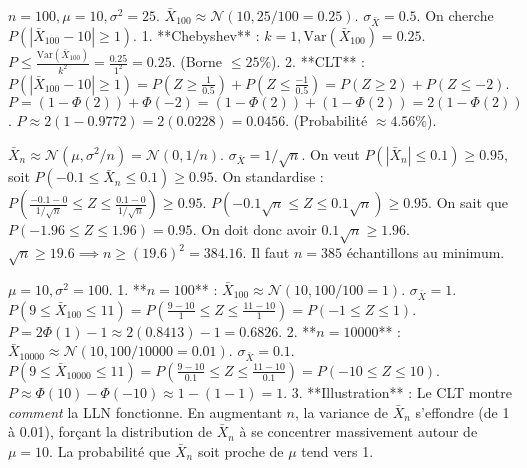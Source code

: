 \begin{correctionbox}
$n=100, \mu=10, \sigma^2=25$. $\bar{X}_{100} \approx \mathcal{N}(10, 25/100=0.25)$. $\sigma_{\bar{X}} = 0.5$.
On cherche $P(|\bar{X}_{100} - 10| \ge 1)$.
1.  **Chebyshev** : $k=1, \text{Var}(\bar{X}_{100}) = 0.25$.
    $P \le \frac{\text{Var}(\bar{X}_{100})}{k^2} = \frac{0.25}{1^2} = 0.25$. (Borne $\le 25\%$).
2.  **CLT** : $P(|\bar{X}_{100} - 10| \ge 1) = P(Z \ge \frac{1}{0.5}) + P(Z \le \frac{-1}{0.5}) = P(Z \ge 2) + P(Z \le -2)$.
    $P = (1 - \Phi(2)) + \Phi(-2) = (1 - \Phi(2)) + (1 - \Phi(2)) = 2(1 - \Phi(2))$.
    $P \approx 2(1 - 0.9772) = 2(0.0228) = 0.0456$. (Probabilité $\approx 4.56\%$).
\end{correctionbox}

\begin{correctionbox}
$\bar{X}_n \approx \mathcal{N}(\mu, \sigma^2/n) = \mathcal{N}(0, 1/n)$. $\sigma_{\bar{X}} = 1/\sqrt{n}$.
On veut $P(|\bar{X}_n| \le 0.1) \ge 0.95$, soit $P(-0.1 \le \bar{X}_n \le 0.1) \ge 0.95$.
On standardise : $P\left( \frac{-0.1 - 0}{1/\sqrt{n}} \le Z \le \frac{0.1 - 0}{1/\sqrt{n}} \right) \ge 0.95$.
$P(-0.1\sqrt{n} \le Z \le 0.1\sqrt{n}) \ge 0.95$.
On sait que $P(-1.96 \le Z \le 1.96) = 0.95$.
On doit donc avoir $0.1\sqrt{n} \ge 1.96$.
$\sqrt{n} \ge 19.6 \implies n \ge (19.6)^2 = 384.16$.
Il faut $n=385$ échantillons au minimum.
\end{correctionbox}

\begin{correctionbox}
$\mu=10, \sigma^2=100$.
1.  **$n=100$** : $\bar{X}_{100} \approx \mathcal{N}(10, 100/100=1)$. $\sigma_{\bar{X}} = 1$.
    $P(9 \le \bar{X}_{100} \le 11) = P(\frac{9-10}{1} \le Z \le \frac{11-10}{1}) = P(-1 \le Z \le 1)$.
    $P = 2\Phi(1) - 1 \approx 2(0.8413) - 1 = 0.6826$.
2.  **$n=10000$** : $\bar{X}_{10000} \approx \mathcal{N}(10, 100/10000=0.01)$. $\sigma_{\bar{X}} = 0.1$.
    $P(9 \le \bar{X}_{10000} \le 11) = P(\frac{9-10}{0.1} \le Z \le \frac{11-10}{0.1}) = P(-10 \le Z \le 10)$.
    $P \approx \Phi(10) - \Phi(-10) \approx 1 - (1-1) = 1$.
3.  **Illustration** : Le CLT montre \textit{comment} la LLN fonctionne. En augmentant $n$, la variance de $\bar{X}_n$ s'effondre (de 1 à 0.01), forçant la distribution de $\bar{X}_n$ à se concentrer massivement autour de $\mu=10$. La probabilité que $\bar{X}_n$ soit proche de $\mu$ tend vers 1.
\end{correctionbox}

